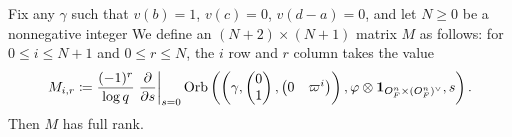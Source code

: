 \begin{lemma}
  Fix any $\gamma$ such that $v(b) = 1$, $v(c) = 0$, $v(d-a) = 0$,
  and let $N \ge 0$ be a nonnegative integer
  We define an $(N+2) \times (N+1)$ matrix $M$ as follows:
  for $0 \le i \le N+1$ and $0 \le r \le N$,
  the $i$ row and $r$ column takes the value
  \[
    M_{i,r} \coloneqq
    \frac{(-1)^r}{\log q}
    \left. \pdv{}{s} \right\rvert_{s=0}
      \operatorname{Orb}\left( \left(\gamma, \begin{pmatrix} 0 \\ 1 \end{pmatrix},
      \begin{pmatrix} 0 & \varpi^i \end{pmatrix} \right),
      \varphi \otimes \mathbf{1}_{O_F^n \times (O_F^n)^\vee}, s\right).
  \]
  Then $M$ has full rank.
\end{lemma}
